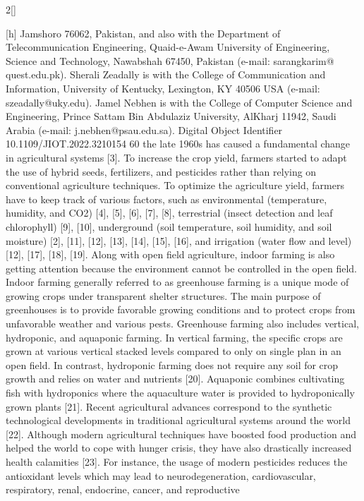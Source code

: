 \documentclass[10pt]{article}
\begin{document}
\begin{multicols}{2}[]
{\begin{table}
    \label{tab:my_label}
\end{table}[h]
Jamshoro 76062, Pakistan, and also with the Department of
Telecommunication Engineering, Quaid-e-Awam University of Engineering,
Science and Technology, Nawabshah 67450, Pakistan (e-mail: sarangkarim@
quest.edu.pk).
Sherali Zeadally is with the College of Communication and
Information, University of Kentucky, Lexington, KY 40506 USA (e-mail:
szeadally@uky.edu).
Jamel Nebhen is with the College of Computer Science and Engineering,
Prince Sattam Bin Abdulaziz University, AlKharj 11942, Saudi Arabia
(e-mail: j.nebhen@psau.edu.sa).
Digital Object Identifier 10.1109/JIOT.2022.3210154
60%
the late 1960s has caused a fundamental change in agricultural systems [3]. To increase the crop yield, farmers started
to adapt the use of hybrid seeds, fertilizers, and pesticides
rather than relying on conventional agriculture techniques. To
optimize the agriculture yield, farmers have to keep track of
various factors, such as environmental (temperature, humidity,
and CO2) [4], [5], [6], [7], [8], terrestrial (insect detection and
leaf chlorophyll) [9], [10], underground (soil temperature, soil
humidity, and soil moisture) [2], [11], [12], [13], [14], [15],
[16], and irrigation (water flow and level) [12], [17], [18], [19].
Along with open field agriculture, indoor farming is also
getting attention because the environment cannot be controlled
in the open field. Indoor farming generally referred to as
greenhouse farming is a unique mode of growing crops under
transparent shelter structures. The main purpose of greenhouses is to provide favorable growing conditions and to
protect crops from unfavorable weather and various pests.
Greenhouse farming also includes vertical, hydroponic, and
aquaponic farming. In vertical farming, the specific crops are
grown at various vertical stacked levels compared to only on
single plan in an open field. In contrast, hydroponic farming does not require any soil for crop growth and relies
on water and nutrients [20]. Aquaponic combines cultivating fish with hydroponics where the aquaculture water is
provided to hydroponically grown plants [21]. Recent agricultural advances correspond to the synthetic technological
developments in traditional agricultural systems around the
world [22].
Although modern agricultural techniques have boosted food
production and helped the world to cope with hunger crisis,
they have also drastically increased health calamities [23]. For
instance, the usage of modern pesticides reduces the antioxidant levels which may lead to neurodegeneration, cardiovascular, respiratory, renal, endocrine, cancer, and reproductive
}
\end{multicols}
\end{document}
